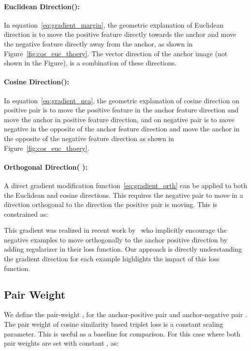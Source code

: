\documentclass[10pt,twocolumn,letterpaper]{article}
\begin{document}
\paragraph{Euclidean Direction():}
In equation~\ref{eq:gradient_margin}, the geometric explanation of Euclidean direction is to move the positive feature directly towards the anchor and move the negative feature directly away from the anchor, as shown in Figure~\ref{fig:cos_euc_thoery}.  The vector direction of the anchor image (not shown in the Figure), is a combination of these directions.

\paragraph{Cosine Direction():}
In equation~\ref{eq:gradient_nca}, the geometric explanation of cosine direction on positive pair is to move the positive feature in the anchor feature direction and move the anchor in positive feature direction, and on negative pair is to move negative in the opposite of the anchor feature direction and move the anchor in the opposite of the negative feature direction as shown in Figure~\ref{fig:cos_euc_thoery}.

\paragraph{Orthogonal Direction(  ):} 
A direct gradient modification function~\ref{eq:gradient_orth} can be applied to both the  Euclidean and cosine directions.  This requires the negative pair to move in a direction orthogonal to the direction the positive pair is moving.  This is constrained as:


This gradient was realized in recent work by~\cite{Mohan_2020_CVPR} who implicitly encourage the negative examples to move orthogonally to the anchor positive direction by adding regularizer in their loss function.  Our approach is directly understanding the gradient direction for each example highlights the impact of this loss function.

\subsection{Pair Weight}
\label{sec:idea_wp}
We define the pair-weight , for the anchor-positive pair  and anchor-negative pair . The pair weight of cosine similarity  based triplet loss is a constant scaling parameter.  This is useful as a baseline for comparison. For this case where both pair weights are set with constant , as:
\end{document}
